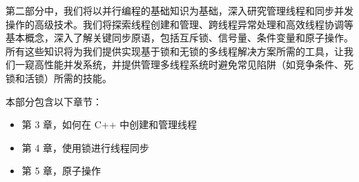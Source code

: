 第二部分中，我们将以并行编程的基础知识为基础，深入研究管理线程和同步并发操作的高级技术。我们将探索线程创建和管理、跨线程异常处理和高效线程协调等基本概念，深入了解关键同步原语，包括互斥锁、信号量、条件变量和原子操作。所有这些知识将为我们提供实现基于锁和无锁的多线程解决方案所需的工具，让我们一窥高性能并发系统，并提供管理多线程系统时避免常见陷阱（如竞争条件、死锁和活锁）所需的技能。

本部分包含以下章节：

\begin{itemize}
\item
第 3 章，如何在 C++ 中创建和管理线程

\item
第 4 章，使用锁进行线程同步

\item
第 5 章，原子操作
\end{itemize}
